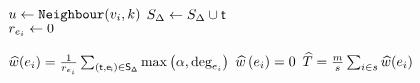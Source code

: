 \begin{algorithm}[ht!]
\begin{algorithmic}[1]
                \State $u \gets \texttt{Neighbour}{\left({v_i,k}\right)}$
                \label{Line: Remove Duplicate Triangles} 
                    \State $S_\Delta \gets S_\Delta \cup \sf t$ \\
                \EndIf
            \EndFor
            \Else
                \State $r_{e_i} \gets 0$
            \EndIf
        \EndFor
\iffalse{\For{$\edge \in \samplededges$}
            \If{$\querycount_\edge > 0$}
                \State $\empweightfunc(\edge) = \frac{1}{\querycount_{\edge}} \sum_{(\triangle,\edge) \in \sampledtriangles} \max\fbrac{\arboricity,\degree{\edge}}$
            \Else
                \State $\empweightfunc\fbrac{\edge} = 0$
            \EndIf
        \EndFor
        \State \Return $\emptriangle = \frac{\edgecount}{\edgesamplesize}\sum_{\edge \in \samplededges} \empweightfunc(\edge)$}
\fi 
                \State $\widehat{w}(e_i) = \frac{1}{r_{e_i}} \sum_{(\sf t,e_i) \in S_\Delta} \max\left({\alpha,\mbox{deg}_{e_i}}\right)$
            \Else
                \State $\widehat{w}\left({e_i}\right) = 0$
            \EndIf
        \EndFor
        \State \Return $\widehat{T} = \frac{m}{s}\sum_{i \in s} \widehat{w}(e_i)$
    \end{algorithmic}
\end{algorithm}
